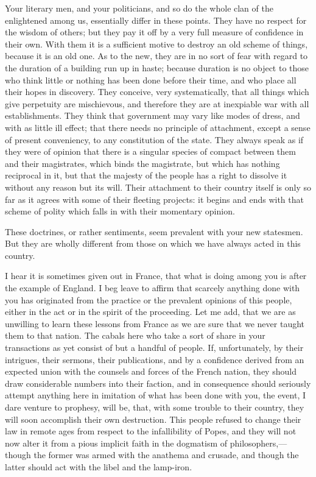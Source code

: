 Your literary men, and your politicians, and so do the whole clan of the enlightened among us, essentially differ in these points. They have no respect for the wisdom of others; but they pay it off by a very full measure of confidence in their own. With them it is a sufficient motive to destroy an old scheme of things, because it is an old one. As to the new, they are in no sort of fear with regard to the duration of a building run up in haste; because duration is no object to those who think little or nothing has been done before their time, and who place all their hopes in discovery. They conceive, very systematically, that all things which give perpetuity are mischievous, and therefore they are at inexpiable war with all establishments. They think that government may vary like modes of dress, and with as little ill effect; that there needs no principle of attachment, except a sense of present conveniency, to any constitution of the state. They always speak as if they were of opinion that there is a singular species of compact between them and their magistrates, which binds the magistrate, but which has nothing reciprocal in it, but that the majesty of the people has a right to dissolve it without any reason but its will. Their attachment to their country itself is only so far as it agrees with some of their fleeting projects: it begins and ends with that scheme of polity which falls in with their momentary opinion.

These doctrines, or rather sentiments, seem prevalent with your new statesmen. But they are wholly different from those on which we have always acted in this country.

I hear it is sometimes given out in France, that what is doing among you is after the example of England. I beg leave to affirm that scarcely anything done with you has originated from the practice or the prevalent opinions of this people, either in the act or in the spirit of the proceeding. Let me add, that we are as unwilling to learn these lessons from France as we are sure that we never taught them to that nation. The cabals here who take a sort of share in your transactions as yet consist of but a handful of people. If, unfortunately, by their intrigues, their sermons, their publications, and by a confidence derived from an expected union with the counsels and forces of the French nation, they should draw considerable numbers into their faction, and in consequence should seriously attempt anything here in imitation of what has been done with you, the event, I dare venture to prophesy, will be, that, with some trouble to their country, they will soon accomplish their own destruction. This people refused to change their law in remote ages from respect to the infallibility of Popes, and they will not now alter it from a pious implicit faith in the dogmatism of philosophers,—though the former was armed with the anathema and crusade, and though the latter should act with the libel and the lamp-iron.

